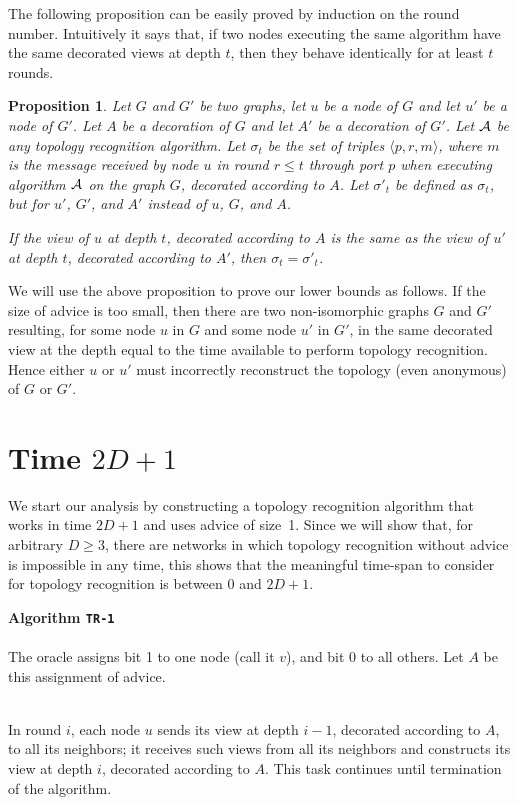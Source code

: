 \documentclass{article}
\newcommand{\cA}{{\cal A}}
\newtheorem{proposition}{Proposition}[section]
\newcommand{\algo}[1]{
\medskip
\noindent \textbf{Algorithm {\tt #1}}\\
\nopagebreak}
\begin{document}
The following proposition can be easily proved by induction on the round number.
Intuitively it says that, if two nodes executing the same algorithm have the same decorated views at depth $t$, then they behave identically for at least $t$ rounds.

\begin{proposition}\label{propSameHistory}
Let $G$ and $G'$ be two graphs, let $u$ be a node of $G$ and let $u'$ be a node of $G'$. Let $A$ be a decoration of $G$ and let $A'$ be a decoration of $G'$.
Let $\cA$ be any topology recognition algorithm.
Let $\sigma_t$ be the set of triples $\langle p,r,m\rangle$, where $m$ is the message received by node $u$ in round $r\le t$ through port $p$ when executing algorithm $\cA$ on the graph $G$, decorated according to $A$. Let $\sigma'_t$ be defined as $\sigma_t$, but for $u'$, $G'$, and $A'$ instead of $u$, $G$, and $A$.

If the view of $u$ at depth $t$, decorated according to $A$ is the same as the view of $u'$ at depth $t$, decorated according to $A'$, then $\sigma_t = \sigma'_t$.
\end{proposition}

We will use the above proposition to prove our lower bounds as follows.
If the size of advice is too small, then there are two non-isomorphic graphs $G$ and $G'$ resulting, for some node $u$ in $G$ and some node $u'$ in $G'$, in the same decorated view at the depth equal to the time available to perform topology recognition.
Hence either $u$ or $u'$ must incorrectly reconstruct the topology (even anonymous) of $G$ or $G'$.


\section{Time  $2D+1$}


We start our analysis by constructing a topology recognition algorithm that works in time $2D+1$ and uses advice of size~1.
Since we will show that, for arbitrary $D\ge 3$, there are networks in which topology recognition without advice is impossible in any time,
this shows that the meaningful time-span to consider for topology recognition is between $0$ and $2D+1$.


\algo{TR-1}
\\
The oracle assigns bit 1 to one node (call it $v$), and bit 0 to all others. Let $A$ be this assignment of advice.

\\
In round $i$, each node $u$ sends its view at depth $i-1$, decorated according to $A$, to all its neighbors;
it receives such views from all its neighbors and constructs its view at depth $i$, decorated according to $A$.
This task continues until termination of the algorithm.
\end{document}
